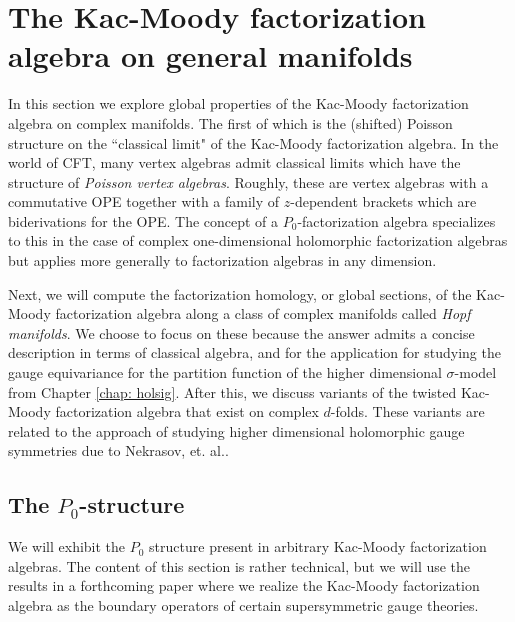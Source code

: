 

\section{The Kac-Moody factorization algebra on general manifolds}

In this section we explore global properties of the Kac-Moody factorization algebra on complex manifolds. 
The first of which is the (shifted) Poisson structure on the ``classical limit" of the Kac-Moody factorization algebra.
In the world of CFT, many vertex algebras admit classical limits which have the structure of {\em Poisson vertex algebras}. 
Roughly, these are vertex algebras with a commutative OPE together with a family of $z$-dependent brackets which are biderivations for the OPE.
The concept of a $P_0$-factorization algebra specializes to this in the case of complex one-dimensional holomorphic factorization algebras but applies more generally to factorization algebras in any dimension.

Next, we will compute the factorization homology, or global sections, of the Kac-Moody factorization algebra along a class of complex manifolds called {\em Hopf manifolds}.
We choose to focus on these because the answer admits a concise description in terms of classical algebra, and for the application for studying the gauge equivariance for the partition function of the higher dimensional $\sigma$-model from Chapter \ref{chap: holsig}. 
After this, we discuss variants of the twisted Kac-Moody factorization algebra that exist on complex $d$-folds.
These variants are related to the approach of studying higher dimensional holomorphic gauge symmetries due to Nekrasov, et. al..

\subsection{The $P_0$-structure}

We will exhibit the $P_0$ structure present in arbitrary Kac-Moody factorization algebras. 
The content of this section is rather technical, but we will use the results in a forthcoming paper where we realize the Kac-Moody factorization algebra as the boundary operators of certain supersymmetric gauge theories.
 
